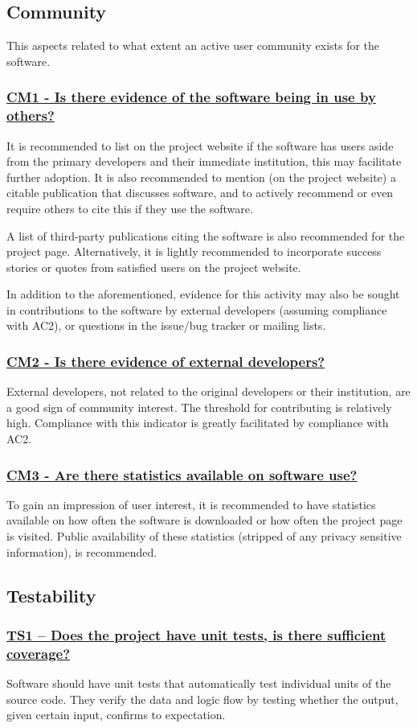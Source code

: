 \documentclass[a4paper,11pt]{article}
\newcommand{\indicator}[1]{\subsubsection*{\underline{#1}}}
\begin{document}
\subsection{Community}

This aspects related to what extent an active user community exists for the
software.

\indicator{CM1 - Is there evidence of the software being in use by others?}

It is recommended to list on the project website if the software has 
users aside from the primary developers and their immediate institution, this
may facilitate further adoption. It is also recommended to mention (on the
project website) a citable publication that discusses software, and to actively
recommend or even require others to cite this if they use the software.

A list of third-party publications citing the software is also recommended for
the project page. Alternatively, it is lightly recommended to
incorporate success stories or quotes from satisfied users on the project
website.

In addition to the aforementioned, evidence for this activity may also be sought
in contributions to the software by external developers (assuming
compliance with AC2), or questions in the issue/bug tracker or mailing lists.

\indicator{CM2 - Is there evidence of external developers?}

External developers, not related to the original developers or their
institution, are a good sign of community interest. The threshold for
contributing is relatively high. Compliance with this indicator is greatly
facilitated by compliance with AC2.

\indicator{CM3 - Are there statistics available on software use?}

To gain an impression of user interest, it is recommended to have statistics
available on how often the software is downloaded or how often the project page
is visited. Public availability of these statistics (stripped of any privacy
sensitive information), is recommended.

\subsection{Testability}

\indicator{TS1 -- Does the project have unit tests, is there sufficient coverage?}

Software should have unit tests that automatically test individual units of the
source code. They verify the data and logic flow by testing whether the output,
given certain input, confirms to expectation.
\end{document}
